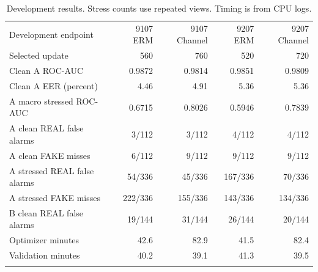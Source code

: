 \begin{table}[t]
\caption{Development results. Stress counts use repeated views. Timing is from CPU logs.}\label{tab:development}
\centering
\begin{tabular}{@{}lrrrr@{}}
\toprule
Development endpoint & 9107 ERM & 9107 Channel & 9207 ERM & 9207 Channel \\
\colrule
Selected update & 560 & 760 & 520 & 720 \\
Clean A ROC-AUC & 0.9872 & 0.9814 & 0.9851 & 0.9809 \\
Clean A EER (percent) & 4.46 & 4.91 & 5.36 & 5.36 \\
A macro stressed ROC-AUC & 0.6715 & 0.8026 & 0.5946 & 0.7839 \\
A clean REAL false alarms & 3/112 & 3/112 & 4/112 & 4/112 \\
A clean FAKE misses & 6/112 & 9/112 & 9/112 & 9/112 \\
A stressed REAL false alarms & 54/336 & 45/336 & 167/336 & 70/336 \\
A stressed FAKE misses & 222/336 & 155/336 & 143/336 & 134/336 \\
B clean REAL false alarms & 19/144 & 31/144 & 26/144 & 20/144 \\
Optimizer minutes & 42.6 & 82.9 & 41.5 & 82.4 \\
Validation minutes & 40.2 & 39.1 & 41.3 & 39.5 \\
\botrule
\end{tabular}
\end{table}
